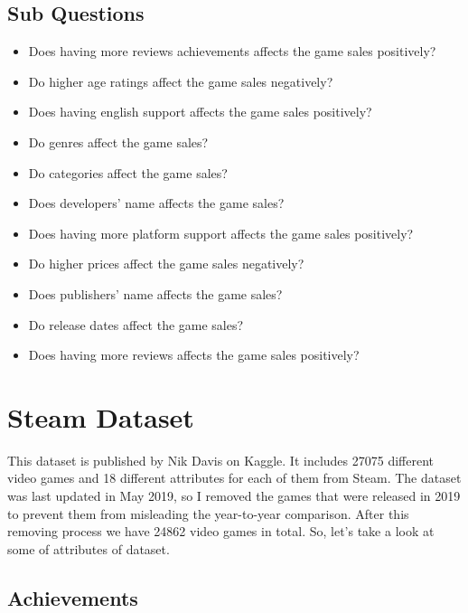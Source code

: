 \documentclass[conference]{IEEEtran}
\begin{document}
\subsection{Sub Questions}
\begin{itemize}
\item Does having more reviews achievements affects the game sales positively?
\item Do higher age ratings affect the game sales negatively?
\item Does having english support affects the game sales positively?
\item Do genres affect the game sales?
\item Do categories affect the game sales?
\item Does developers' name affects the game sales?
\item Does having more platform support affects the game sales positively?
\item Do higher prices affect the game sales negatively?
\item Does publishers' name affects the game sales?
\item Do release dates affect the game sales?
\item Does having more reviews affects the game sales positively?
\end{itemize}

\section{Steam Dataset}
This dataset is published by Nik Davis on Kaggle. It includes 27075 different video games and 18 different attributes for each of them from Steam. The dataset was last updated in May 2019, so I removed the games that were released in 2019 to prevent them from misleading the year-to-year comparison. After this removing process we have 24862 video games in total. So, let's take a look at some of attributes of dataset.

\subsection{Achievements}
\end{document}
